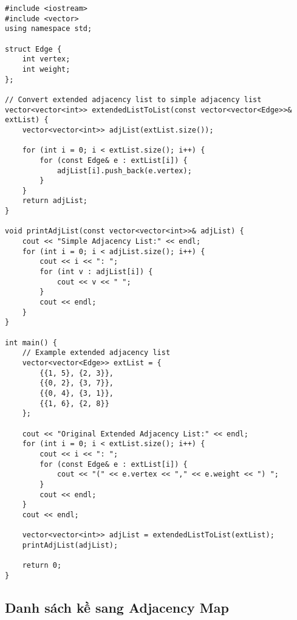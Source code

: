 \documentclass[12pt]{article}
\begin{document}
\begin{lstlisting}[caption={Chuyển đổi từ Danh sách kề mở rộng sang Danh sách kề}]
#include <iostream>
#include <vector>
using namespace std;

struct Edge {
    int vertex;
    int weight;
};

// Convert extended adjacency list to simple adjacency list
vector<vector<int>> extendedListToList(const vector<vector<Edge>>& extList) {
    vector<vector<int>> adjList(extList.size());
    
    for (int i = 0; i < extList.size(); i++) {
        for (const Edge& e : extList[i]) {
            adjList[i].push_back(e.vertex);
        }
    }
    return adjList;
}

void printAdjList(const vector<vector<int>>& adjList) {
    cout << "Simple Adjacency List:" << endl;
    for (int i = 0; i < adjList.size(); i++) {
        cout << i << ": ";
        for (int v : adjList[i]) {
            cout << v << " ";
        }
        cout << endl;
    }
}

int main() {
    // Example extended adjacency list
    vector<vector<Edge>> extList = {
        {{1, 5}, {2, 3}},
        {{0, 2}, {3, 7}},
        {{0, 4}, {3, 1}},
        {{1, 6}, {2, 8}}
    };
    
    cout << "Original Extended Adjacency List:" << endl;
    for (int i = 0; i < extList.size(); i++) {
        cout << i << ": ";
        for (const Edge& e : extList[i]) {
            cout << "(" << e.vertex << "," << e.weight << ") ";
        }
        cout << endl;
    }
    cout << endl;
    
    vector<vector<int>> adjList = extendedListToList(extList);
    printAdjList(adjList);
    
    return 0;
}
\end{lstlisting}

\subsection{Danh sách kề sang Adjacency Map}
\end{document}
